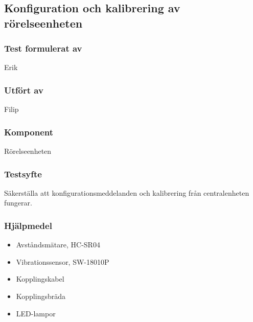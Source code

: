 \clearpage
\subsection{Konfiguration och kalibrering av rörelseenheten}
\label{test:MotionConfig}

\setlength{\columnsep}{1cm}




\begin{multicols}{2}
\subsubsection*{Test formulerat av}
Erik

\subsubsection*{Utfört av}
Filip


\end{multicols}
\subsubsection*{Komponent}
Rörelseenheten


\subsubsection*{Testsyfte}
Säkerställa att konfigurationsmeddelanden och kalibrering från centralenheten fungerar.

\subsubsection*{Hjälpmedel}
\begin{itemize}
	\item Avståndsmätare, HC-SR04
	\item Vibrationssensor, SW-18010P
	\item Kopplingskabel
	\item Kopplingsbräda
	\item LED-lampor
\end{itemize}



